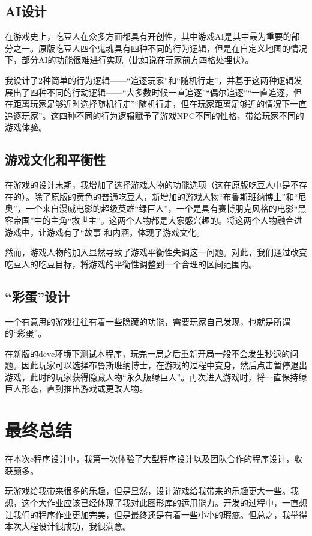 \documentclass[utf8]{ctexart}
\begin{document}
\subsection{AI设计}
在游戏史上，吃豆人在众多方面都具有开创性，其中游戏AI是其中最为重要的部分之一。原版吃豆人四个鬼魂具有四种不同的行为逻辑，但是在自定义地图的情况下，部分AI的功能很难进行实现（比如说在玩家前方四格处埋伏）。\par
我设计了2种简单的行为逻辑——“追逐玩家”和“随机行走”，并基于这两种逻辑发展出了四种不同的行动逻辑——“大多数时候一直追逐”“偶尔追逐”“一直追逐，但在距离玩家足够近时选择随机行走”“随机行走，但在玩家距离足够近的情况下一直追逐玩家”。这四种不同的行为逻辑赋予了游戏NPC不同的性格，带给玩家不同的游戏体验。
\subsection{游戏文化和平衡性}
在游戏的设计末期，我增加了选择游戏人物的功能选项（这在原版吃豆人中是不存在的）。除了原版的黄色的普通吃豆人，新增加的游戏人物“布鲁斯班纳博士”和“尼奥”，一个来自漫威电影的超级英雄“绿巨人”，一个是具有赛博朋克风格的电影“黑客帝国”中的主角“救世主”。这两个人物都是大家感兴趣的。将这两个人物融合进游戏中，让游戏有了“故事
和内涵，体现了游戏文化。\par
然而，游戏人物的加入显然导致了游戏平衡性失调这一问题。对此，我们通过改变吃豆人的吃豆目标，将游戏的平衡性调整到一个合理的区间范围内。\par
\subsection{“彩蛋”设计}
一个有意思的游戏往往有着一些隐藏的功能，需要玩家自己发现，也就是所谓的“彩蛋”。\par
在新版的devc环境下测试本程序，玩完一局之后重新开局一般不会发生秒退的问题。因此玩家可以选择布鲁斯班纳博士，在游戏的过程中变身，然后点击暂停退出游戏，此时的玩家获得隐藏人物“永久版绿巨人”。再次进入游戏时，将一直保持绿巨人形态，直到推出游戏或更改人物。
\section{最终总结}
在本次c程序设计中，我第一次体验了大型程序设计以及团队合作的程序设计，收获颇多。\par
玩游戏给我带来很多的乐趣，但是显然，设计游戏给我带来的乐趣更大一些。我想，这个大作业应该已经体现了我对此图形库的运用能力。开发的过程中，一直想让我们的程序作业更加完美，但是最终还是有着一些小小的瑕疵。但总之，我举得本次大程设计很成功，我很满意。\par
\end{document}
